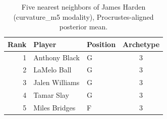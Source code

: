 \begin{table}[htbp]
  \centering\small
  \begin{tabular}{rllc}
    \toprule
    Rank & Player & Position & Archetype \\
    \midrule
    1 & Anthony Black & G & 3 \\
    2 & LaMelo Ball & G & 3 \\
    3 & Jalen Williams & G & 3 \\
    4 & Tamar Slay & G & 3 \\
    5 & Miles Bridges & F & 3 \\
    \bottomrule
  \end{tabular}
  \caption{Five nearest neighbors of James Harden (curvature_m5 modality), Procrustes-aligned posterior mean.}
  \label{tab:James_Harden_neighbors_curvature_m5}
\end{table}

